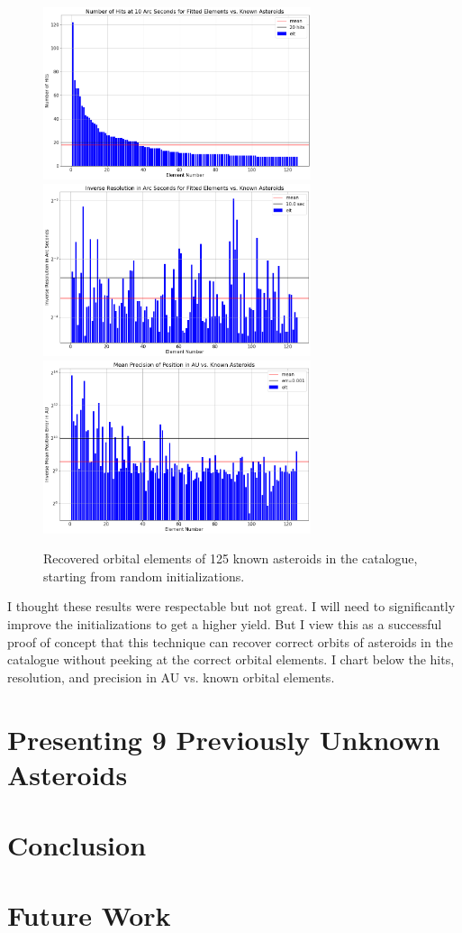 \begin{figure}[h]
\begin{center}
\includegraphics[width=0.70\textwidth]{../figs/search_known/random/hits.png}
\includegraphics[width=0.70\textwidth]{../figs/search_known/random/resolution.png}
\includegraphics[width=0.70\textwidth]{../figs/search_known/random/near_ast_dist.png}
\caption{Recovered orbital elements of 125 known asteroids in the catalogue, starting from random initializations.}
\end{center}
\end{figure}
\clearpage
I thought these results were respectable but not great.
I will need to significantly improve the initializations to get a higher yield.
But I view this as a successful proof of concept that this technique can recover correct orbits of asteroids 
in the catalogue without peeking at the correct orbital elements.
I chart below the hits, resolution, and precision in AU vs. known orbital elements.

\section{Presenting 9 Previously Unknown Asteroids}
\label{section_results_unknown_ast}


\section{Conclusion}
\label{search_conclusion}

\section{Future Work}
\label{section_future_work}
